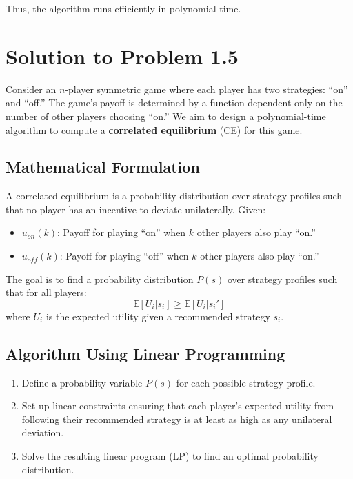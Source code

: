\documentclass{article}
\begin{document}
Thus, the algorithm runs efficiently in polynomial time.

\section*{Solution to Problem 1.5}

Consider an $n$-player symmetric game where each player has two strategies: ``on'' and ``off.'' The game's payoff is determined by a function dependent only on the number of other players choosing ``on.'' We aim to design a polynomial-time algorithm to compute a \textbf{correlated equilibrium} (CE) for this game.

\subsection*{Mathematical Formulation}

A correlated equilibrium is a probability distribution over strategy profiles such that no player has an incentive to deviate unilaterally. Given:
\begin{itemize}
    \item $u_{on}(k)$: Payoff for playing ``on'' when $k$ other players also play ``on.''
    \item $u_{off}(k)$: Payoff for playing ``off'' when $k$ other players also play ``on.''
\end{itemize}

The goal is to find a probability distribution $P(s)$ over strategy profiles such that for all players:
\[
\mathbb{E}[U_i | s_i] \geq \mathbb{E}[U_i | s_i']
\]
where $U_i$ is the expected utility given a recommended strategy $s_i$.

\subsection*{Algorithm Using Linear Programming}

\begin{enumerate}
    \item Define a probability variable $P(s)$ for each possible strategy profile.
    \item Set up linear constraints ensuring that each player's expected utility from following their recommended strategy is at least as high as any unilateral deviation.
    \item Solve the resulting linear program (LP) to find an optimal probability distribution.
\end{enumerate}
\end{document}
